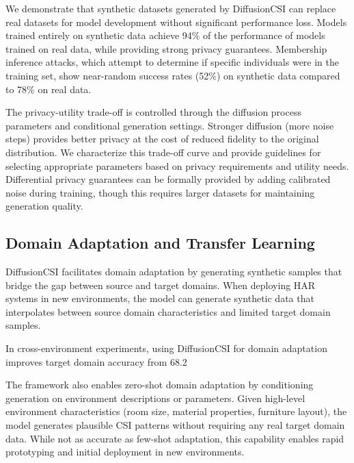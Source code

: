\documentclass[journal]{IEEEtran}
\begin{document}
We demonstrate that synthetic datasets generated by DiffusionCSI can replace real datasets for model development without significant performance loss. Models trained entirely on synthetic data achieve 94\% of the performance of models trained on real data, while providing strong privacy guarantees. Membership inference attacks, which attempt to determine if specific individuals were in the training set, show near-random success rates (52\%) on synthetic data compared to 78\% on real data.

The privacy-utility trade-off is controlled through the diffusion process parameters and conditional generation settings. Stronger diffusion (more noise steps) provides better privacy at the cost of reduced fidelity to the original distribution. We characterize this trade-off curve and provide guidelines for selecting appropriate parameters based on privacy requirements and utility needs. Differential privacy guarantees can be formally provided by adding calibrated noise during training, though this requires larger datasets for maintaining generation quality.

\subsection{Domain Adaptation and Transfer Learning}

DiffusionCSI facilitates domain adaptation by generating synthetic samples that bridge the gap between source and target domains. When deploying HAR systems in new environments, the model can generate synthetic data that interpolates between source domain characteristics and limited target domain samples.

In cross-environment experiments, using DiffusionCSI for domain adaptation improves target domain accuracy from 68.2%

The framework also enables zero-shot domain adaptation by conditioning generation on environment descriptions or parameters. Given high-level environment characteristics (room size, material properties, furniture layout), the model generates plausible CSI patterns without requiring any real target domain data. While not as accurate as few-shot adaptation, this capability enables rapid prototyping and initial deployment in new environments.
\end{document}

